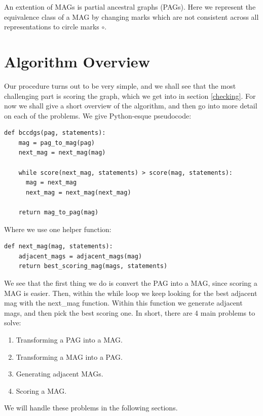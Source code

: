 \documentclass[11pt,a4paper]{report}
\theoremstyle{definition}
\begin{document}
An extention of MAGs is partial ancestral graphs (PAGs). Here we represent
the equivalence class of a MAG by changing marks which are not consistent
across all representations to circle marks $\circ$.

\chapter{Algorithm Overview}\label{algorithm}
Our procedure turns out to be very simple, and we shall see that the most
challenging part is scoring the graph, which we get into in section
\ref{checking}. For now we shall give a short overview of the algorithm,
and then go into more detail on each of the problems. We give Python-esque
pseudocode:

\begin{lstlisting}
def bccdgs(pag, statements):
    mag = pag_to_mag(pag)
    next_mag = next_mag(mag)

    while score(next_mag, statements) > score(mag, statements):
      mag = next_mag
      next_mag = next_mag(next_mag)

    return mag_to_pag(mag)
\end{lstlisting}
Where we use one helper function:
\begin{lstlisting}
def next_mag(mag, statements):
    adjacent_mags = adjacent_mags(mag)
    return best_scoring_mag(mags, statements)
\end{lstlisting}
We see that the first thing we do is convert the PAG into a MAG, since
scoring a MAG is easier. Then, within the while loop we keep looking for
the best adjacent mag with the next\_mag function. Within this function we
generate adjacent mags, and then pick the best scoring one. In short,
there are 4 main problems to solve:
\begin{enumerate}
  \item Transforming a PAG into a MAG.

  \item Transforming a MAG into a PAG.

  \item Generating adjacent MAGs.

  \item Scoring a MAG.
\end{enumerate}
We will handle these problems in the following sections.
\end{document}

